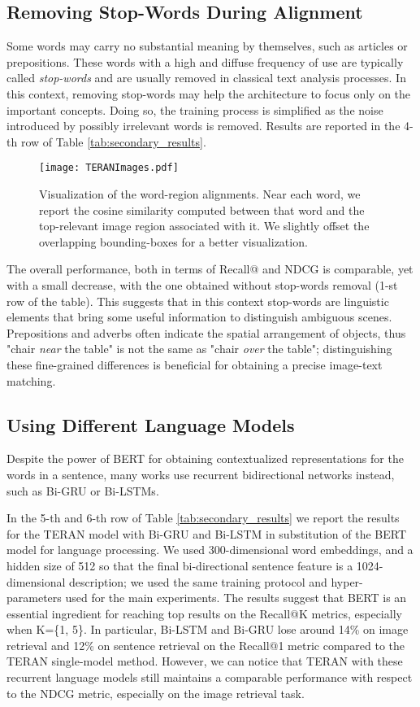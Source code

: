 \documentclass[acmsmall]{acmart}
\newcommand{\majorrevised}[1]{#1}
\begin{document}
\subsection{Removing Stop-Words During Alignment}
Some words may carry no substantial meaning by themselves, such as articles or prepositions. These words with a high and diffuse frequency of use are typically called \textit{stop-words} and are usually removed in classical text analysis processes. In this context, removing stop-words may help the architecture to focus only on the important concepts. Doing so, the training process is simplified as the noise introduced by possibly irrelevant words is removed.
Results are reported in the 4-th row of Table \ref{tab:secondary_results}.
\begin{figure}[t]
    \centering
    \texttt{[image: TERANImages.pdf]}
  \caption{Visualization of the word-region alignments. Near each word, we report the cosine similarity computed between that word and the top-relevant image region associated with it. We slightly offset the overlapping bounding-boxes for a better visualization.}
\label{fig:alignment_visualization}       \end{figure}
The overall performance, both in terms of Recall@ and NDCG is comparable, yet with a small decrease, with the one obtained without stop-words removal (1-st row of the table). 
This suggests that in this context stop-words are linguistic elements that bring some useful information to distinguish ambiguous scenes. Prepositions and adverbs often indicate the spatial arrangement of objects, thus "chair \textit{near} the table" is not the same as "chair \textit{over} the table"; distinguishing these fine-grained differences is beneficial for obtaining a precise image-text matching.

\majorrevised{
\subsection{Using Different Language Models}
Despite the power of BERT \cite{devlin2019bert} for obtaining contextualized representations for the words in a sentence, many works use recurrent bidirectional networks instead, such as Bi-GRU or Bi-LSTMs. 

In the 5-th and 6-th row of Table \ref{tab:secondary_results} we report the results for the TERAN model with Bi-GRU and Bi-LSTM in substitution of the BERT model for language processing. We used 300-dimensional word embeddings, and a hidden size of 512 so that the final bi-directional sentence feature is a 1024-dimensional description; we used the same training protocol and hyper-parameters used for the main experiments. The results suggest that BERT is an essential ingredient for reaching top results on the Recall@K metrics, especially when K=\{1, 5\}. In particular, Bi-LSTM and Bi-GRU lose around 14\% on image retrieval and 12\% on sentence retrieval on the Recall@1 metric compared to the TERAN  single-model method. However, we can notice that TERAN with these recurrent language models still maintains a comparable performance with respect to the NDCG metric, especially on the image retrieval task.
}
\end{document}
